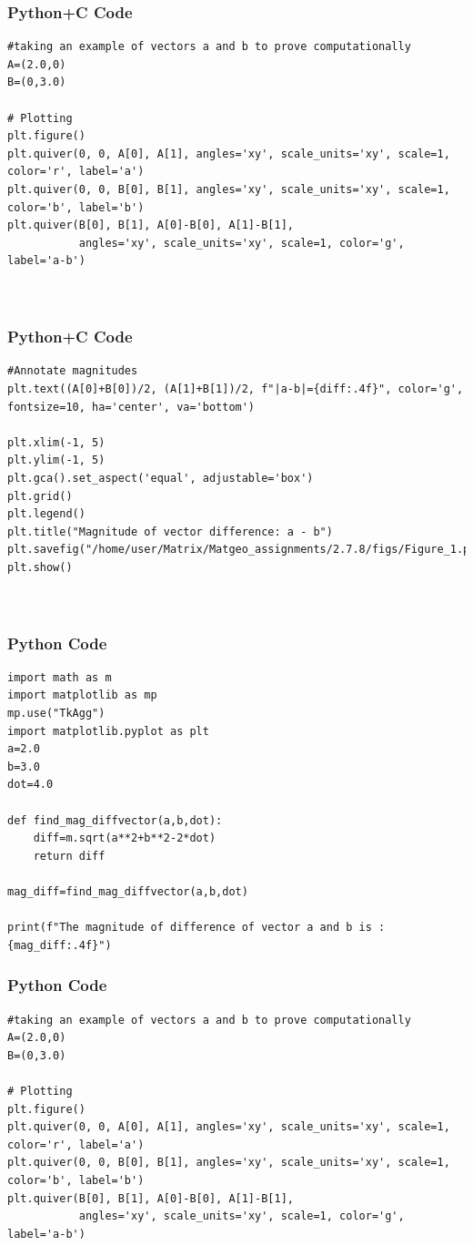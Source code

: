 \documentclass{beamer}
\begin{document}
\begin{frame}[fragile]
    \frametitle{Python+C Code}
    \begin{lstlisting}
#taking an example of vectors a and b to prove computationally
A=(2.0,0)
B=(0,3.0)

# Plotting
plt.figure()
plt.quiver(0, 0, A[0], A[1], angles='xy', scale_units='xy', scale=1, color='r', label='a')
plt.quiver(0, 0, B[0], B[1], angles='xy', scale_units='xy', scale=1, color='b', label='b')
plt.quiver(B[0], B[1], A[0]-B[0], A[1]-B[1],
           angles='xy', scale_units='xy', scale=1, color='g', label='a-b')



    \end{lstlisting}
\end{frame}

\begin{frame}[fragile]
    \frametitle{Python+C Code}
    \begin{lstlisting}
#Annotate magnitudes
plt.text((A[0]+B[0])/2, (A[1]+B[1])/2, f"|a-b|={diff:.4f}", color='g', fontsize=10, ha='center', va='bottom')

plt.xlim(-1, 5)
plt.ylim(-1, 5)
plt.gca().set_aspect('equal', adjustable='box')
plt.grid()
plt.legend()
plt.title("Magnitude of vector difference: a - b")
plt.savefig("/home/user/Matrix/Matgeo_assignments/2.7.8/figs/Figure_1.png")
plt.show()



    \end{lstlisting}
\end{frame}




\begin{frame}[fragile]
    \frametitle{Python Code}
    \begin{lstlisting}
import math as m
import matplotlib as mp
mp.use("TkAgg")
import matplotlib.pyplot as plt
a=2.0
b=3.0
dot=4.0

def find_mag_diffvector(a,b,dot):
    diff=m.sqrt(a**2+b**2-2*dot)
    return diff

mag_diff=find_mag_diffvector(a,b,dot)

print(f"The magnitude of difference of vector a and b is :{mag_diff:.4f}")
    \end{lstlisting}
\end{frame}

\begin{frame}[fragile]
    \frametitle{Python Code}
    \begin{lstlisting}
#taking an example of vectors a and b to prove computationally
A=(2.0,0)
B=(0,3.0)

# Plotting
plt.figure()
plt.quiver(0, 0, A[0], A[1], angles='xy', scale_units='xy', scale=1, color='r', label='a')
plt.quiver(0, 0, B[0], B[1], angles='xy', scale_units='xy', scale=1, color='b', label='b')
plt.quiver(B[0], B[1], A[0]-B[0], A[1]-B[1],
           angles='xy', scale_units='xy', scale=1, color='g', label='a-b')



    \end{lstlisting}
\end{frame}
\end{document}
